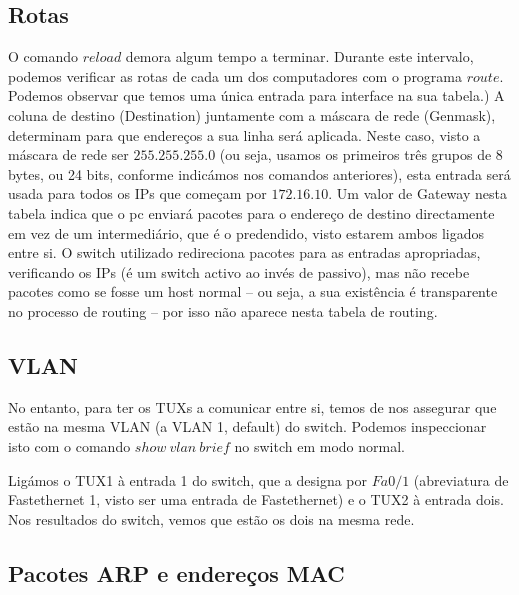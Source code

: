 \documentclass[a4paper,11pt,titlepage]{article}
\begin{document}
\subsection*{Rotas}

O comando $reload$ demora algum tempo a terminar. Durante este intervalo,
podemos verificar as rotas de cada um dos computadores com o programa
$route$.
Podemos observar que temos uma única entrada para interface na sua tabela.)
A coluna de destino (Destination) juntamente com a máscara de rede (Genmask),
determinam para que endereços a sua linha será aplicada. Neste caso, visto a
máscara de rede ser $255.255.255.0$ (ou seja, usamos os primeiros três grupos
de 8 bytes, ou 24 bits, conforme indicámos nos comandos anteriores), esta
entrada será usada para todos os IPs que começam por $172.16.10$.
Um valor de Gateway nesta tabela indica que o pc enviará pacotes para o endereço de destino directamente em vez de um intermediário, que é o predendido, visto
estarem ambos ligados entre si. O switch utilizado redireciona pacotes para as
entradas apropriadas, verificando os IPs (é um switch activo ao invés de
passivo), mas não recebe pacotes como se fosse um host normal -- ou seja, a sua
existência é transparente no processo de routing -- por isso não aparece nesta
tabela de routing.

\subsection*{VLAN}

No entanto, para ter os TUXs a comunicar entre si, temos de nos assegurar que
estão na mesma VLAN (a VLAN 1, default) do switch. Podemos inspeccionar isto
com o comando $show\ vlan\ brief$ no switch em modo normal.


Ligámos o TUX1 à entrada 1 do switch, que a designa por $Fa0/1$ (abreviatura de
Fastethernet 1, visto ser uma entrada de Fastethernet) e o TUX2 à entrada dois.
Nos resultados do switch, vemos que estão os dois na mesma rede.

\subsection{Pacotes ARP e endereços MAC}
\end{document}
